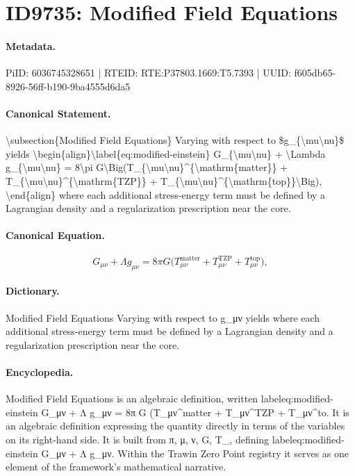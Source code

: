 \section*{ID9735: Modified Field Equations}
\paragraph{Metadata.}
PiID: 6036745328651 | RTEID: RTE:P37803.1669:T5.7393 | UUID: f605db65-8926-56ff-b190-9ba4555d6da5

\paragraph{Canonical Statement.}
\textbackslash{}subsection\{Modified Field Equations\} Varying with respect to \$g\_\{\textbackslash{}mu\textbackslash{}nu\}\$ yields \textbackslash{}begin\{align\}\textbackslash{}label\{eq:modified-einstein\} G\_\{\textbackslash{}mu\textbackslash{}nu\} + \textbackslash{}Lambda g\_\{\textbackslash{}mu\textbackslash{}nu\} = 8\textbackslash{}pi G\textbackslash{}Big(T\_\{\textbackslash{}mu\textbackslash{}nu\}\textasciicircum{}\{\textbackslash{}mathrm\{matter\}\} + T\_\{\textbackslash{}mu\textbackslash{}nu\}\textasciicircum{}\{\textbackslash{}mathrm\{TZP\}\} + T\_\{\textbackslash{}mu\textbackslash{}nu\}\textasciicircum{}\{\textbackslash{}mathrm\{top\}\}\textbackslash{}Big), \textbackslash{}end\{align\} where each additional stress-energy term must be defined by a Lagrangian density and a regularization prescription near the core.

\paragraph{Canonical Equation.}
\[
\label{eq:modified-einstein} G_{\mu\nu} + \Lambda g_{\mu\nu} = 8\pi G\Big(T_{\mu\nu}^{\mathrm{matter}} + T_{\mu\nu}^{\mathrm{TZP}} + T_{\mu\nu}^{\mathrm{top}}\Big),
\]

\paragraph{Dictionary.}
Modified Field Equations Varying with respect to g\_μν yields where each additional stress-energy term must be defined by a Lagrangian density and a regularization prescription near the core.

\paragraph{Encyclopedia.}
Modified Field Equations is an algebraic definition, written labeleq:modified-einstein G\_μν + Λ g\_μν = 8π G (T\_μν\textasciicircum{}matter + T\_μν\textasciicircum{}TZP + T\_μν\textasciicircum{}to. It is an algebraic definition expressing the quantity directly in terms of the variables on its right-hand side. It is built from π, μ, ν, G, T\_, defining labeleq:modified-einstein G\_μν + Λ g\_μν. Within the Trawin Zero Point registry it serves as one element of the framework's mathematical narrative.
